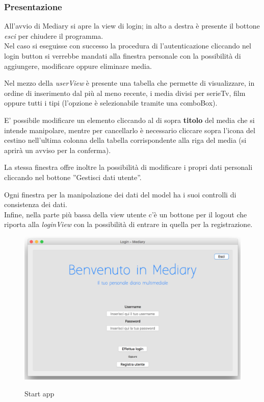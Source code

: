 \documentclass[10pt,a4paper,openany]{article}
\begin{document}
		\subsubsection{Presentazione}
		
		All'avvio di Mediary si apre la view di login; in alto a destra è presente il bottone \textit{esci} per chiudere il programma.\\
		Nel caso si eseguisse con successo la procedura di l'autenticazione cliccando nel login button si verrebbe mandati alla finestra personale con la possibilità di 
		aggiungere, modificare oppure eliminare media.

		Nel mezzo della \emph{userView} è presente una tabella che permette di visualizzare, in ordine di inserimento dal più al meno recente, i media divisi per 
		serieTv, film oppure tutti i tipi (l'opzione è selezionabile tramite una comboBox).

		E' possibile modificare un elemento cliccando al di sopra \textbf{titolo} del media che si intende manipolare, mentre per cancellarlo è necessario cliccare sopra 
		l'icona del cestino nell'ultima colonna della tabella corrispondente alla riga del media (si aprirà un avviso per la conferma).

		La stessa finestra offre inoltre la possibilità di modificare i propri dati personali cliccando nel bottone ''Gestisci dati utente''.

		Ogni finestra per la manipolazione dei dati del model ha i suoi controlli di consistenza dei dati.\\
		Infine, nella parte più bassa della view utente c'è un bottone per il logout che riporta alla \emph{loginView} con la possibilità di entrare in quella per la 
		registrazione.
		

		\begin{figure}[!h]
			\centering
			\includegraphics[angle=0,scale=.45]{Welcome.png}\\
			\caption{Start app}
			\label{fig:Welcome}
		\end{figure}
\end{document}
